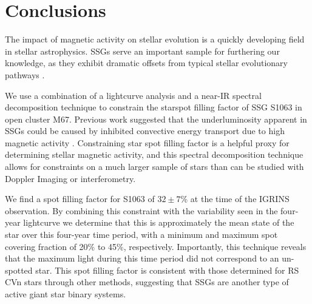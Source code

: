 \documentclass[trackchanges]{aastex631}
\begin{document}




\section{Conclusions}
\label{sec:conclusions}

The impact of magnetic activity on stellar evolution is a quickly developing field in stellar astrophysics. SSGs serve an important sample for furthering our knowledge, as they exhibit dramatic offsets from typical stellar evolutionary pathways \citep{geller17, leiner17}.


We use a combination of a lightcurve analysis and a near-IR spectral decomposition technique to constrain the starspot filling factor of SSG S1063 in open cluster M67. Previous work suggested that the underluminosity apparent in SSGs could be caused by inhibited convective energy transport due to high magnetic activity \citep{leiner17}. Constraining star spot filling factor is a helpful proxy for determining stellar magnetic activity, and this spectral decomposition technique allows for constraints on a much larger sample of stars than can be studied with Doppler Imaging or interferometry.

We find a spot filling factor for S1063 of $32\pm7$\% at the time of the IGRINS observation. By combining this constraint with the variability seen in the four-year lightcurve we determine that this is approximately the mean state of the star over this four-year time period, with a minimum and maximum spot covering fraction of 20\% to 45\%, respectively. Importantly, this technique reveals that the maximum light during this time period did not correspond to an un-spotted star. This spot filling factor is consistent with those determined for RS CVn stars through other methods, suggesting that SSGs are another type of active giant star binary systems.
\end{document}
